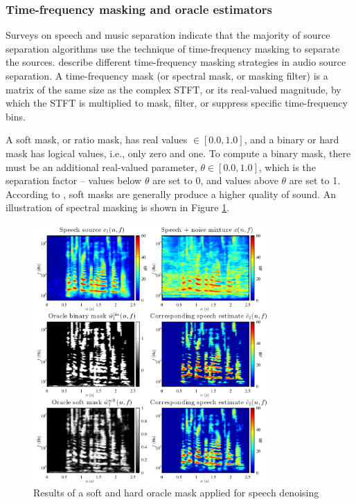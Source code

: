 \documentclass[report.tex]{subfiles}
\begin{document}
\subsubsection{Time-frequency masking and oracle estimators}
\label{sec:masksandoracles}

Surveys on speech \parencite{speechmask} and music separation \parencite{musicmask} indicate that the majority of source separation algorithms use the technique of time-frequency masking to separate the sources.  \textcite{masking} describe different time-frequency masking strategies in audio source separation. A time-frequency mask (or spectral mask, or masking filter) is a matrix of the same size as the complex STFT, or its real-valued magnitude, by which the STFT is multiplied to mask, filter, or suppress specific time-frequency bins.

A soft mask, or ratio mask, has real values $\in [0.0, 1.0]$, and a binary or hard mask has logical values, i.e., only zero and one. To compute a binary mask, there must be an additional real-valued parameter, $\theta \in [0.0, 1.0]$, which is the separation factor -- values below $\theta$ are set to 0, and values above $\theta$ are set to 1. According to \textcite{masking}, soft masks are generally produce a higher quality of sound. An illustration of spectral masking is shown in Figure \ref{fig:masks}.

\begin{figure}[ht]
	\centering
	\includegraphics[width=0.8\textwidth]{./images-mss/maskdemo.png}
	\caption{Results of a soft and hard oracle mask applied for speech denoising \parencite[71]{masking}}
	\label{fig:masks}
\end{figure}
\end{document}
